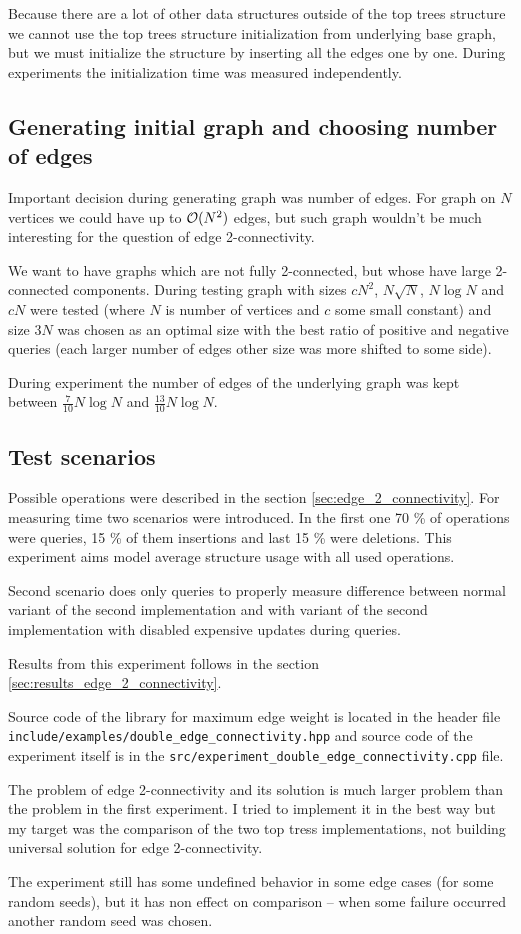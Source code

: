 Because there are a lot of other data structures outside of the top trees
structure we cannot use the top trees structure initialization from underlying
base graph, but we must initialize the structure by inserting all the edges one
by one. During experiments the initialization time was measured independently.

\subsection{Generating initial graph and choosing number of edges}

Important decision during generating graph was number of edges. For graph on $N$
vertices we could have up to ${\cal O}(N^2)$ edges, but such graph wouldn't be much
interesting for the question of edge 2-connectivity.

We want to have graphs which are not fully 2-connected, but whose have large
2-connected components. During testing graph with sizes $cN^2$, $N\sqrt{N}$,
$N\log N$ and $cN$ were tested (where $N$ is number of vertices and $c$ some
small constant) and size $3N$ was chosen as an optimal size with the best
ratio of positive and negative queries (each larger number of edges  other size was more shifted to some
side).

During experiment the number of edges of the underlying graph was kept between
$\frac{7}{10}N\log N$ and $\frac{13}{10}N\log N$.

\subsection{Test scenarios}

Possible operations were described in the section \ref{sec:edge_2_connectivity}.
For measuring time two scenarios were introduced. In the first one 70 \% of
operations were queries, 15 \% of them insertions and last 15 \% were deletions.
This experiment aims model average structure usage with all used operations.

Second scenario does only queries to properly measure difference between normal
variant of the second implementation and with variant of the second
implementation with disabled expensive updates during queries.

Results from this experiment follows in the section \ref{sec:results_edge_2_connectivity}.

Source code of the library for maximum edge weight is located in the header file
\texttt{include/examples/double\_edge\_connectivity.hpp} and source code of the
experiment itself is in the \texttt{src/experiment\_double\_edge\_connectivity.cpp} file.

\bigskip

The problem of edge 2-connectivity and its solution is much larger problem than
the problem in the first experiment. I tried to implement it in the best way
but my target was the comparison of the two top tress implementations, not
building universal solution for edge 2-connectivity.

The experiment still has some undefined behavior in some edge cases (for some
random seeds), but it has non effect on comparison -- when some failure occurred
another random seed was chosen.
